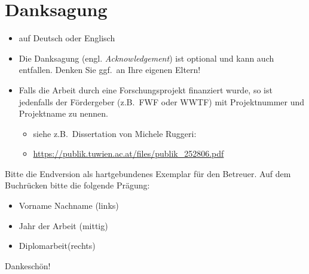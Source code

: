 \cleardoublepage


\chapter*{Danksagung} %
\thispagestyle{empty}

\begin{itemize}
  \item auf Deutsch oder Englisch
  \item Die Danksagung (engl. {\em Acknowledgement}) ist optional und kann auch entfallen. Denken Sie ggf.\ an Ihre eigenen Eltern!

  \item Falls die Arbeit durch eine Forschungsprojekt finanziert wurde, so ist jedenfalls der Fördergeber (z.B.\ FWF oder WWTF) mit Projektnummer und Projektname zu nennen.
        \begin{itemize}
          \item siehe z.B.\ Dissertation von Michele Ruggeri:
          \item[] \href{https://publik.tuwien.ac.at/files/publik_252806.pdf}{\ttfamily https://publik.tuwien.ac.at/files/publik\_252806.pdf}
        \end{itemize}

\end{itemize}

\vfill

Bitte die Endversion als hartgebundenes Exemplar für den Betreuer. Auf dem Buch\-rücken bitte die folgende Prägung:
\begin{itemize}
  \item Vorname Nachname (links)
  \item Jahr der Arbeit (mittig)
  \item Diplomarbeit(rechts)
\end{itemize}
Dankeschön!

\cleardoublepage


